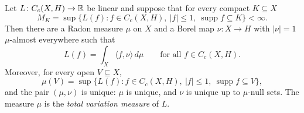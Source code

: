 \begin{theorem}\label{measure-theory:theorem-riesz-vector}
Let $L \colon C_c(X, H) \to \mathbb{R}$ be linear and suppose that for every compact $K \subseteq X$
\[
M_K = \sup\bigl\{L(f) : f \in C_c(X, H),\ |f| \leq 1,\ \operatorname{supp}f \subseteq K\bigr\} < \infty .
\]
Then there are a Radon measure $\mu$ on $X$ and a Borel map $\nu \colon X \to H$ with $|\nu| = 1$ $\mu$-almost everywhere such that
\[
L(f) = \int_X\langle f, \nu\rangle\,d\mu \qquad\text{for all } f \in C_c(X, H).
\]
Moreover, for every open $V \subseteq X$,
\begin{equation}\label{measure-theory:equation-total-variation}
\mu(V) = \sup\bigl\{L(f) : f \in C_c(X, H),\ |f| \leq 1,\ \operatorname{supp}f \subseteq V\bigr\},
\end{equation}
and the pair $(\mu, \nu)$ is unique: $\mu$ is unique, and $\nu$ is unique up to $\mu$-null sets. The measure $\mu$ is the \emph{total variation measure} of $L$.
\end{theorem}

